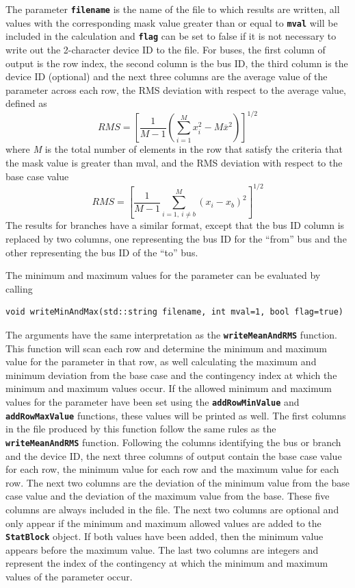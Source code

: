 The parameter \texttt{\textbf{filename}} is the name of the file to which results are written, all values with the corresponding mask value greater than or equal to \texttt{\textbf{mval}} will be included in the calculation and \texttt{\textbf{flag}} can be set to false if it is not necessary to write out the 2-character device ID to the file. For buses, the first column of output is the row index, the second column is the bus ID, the third column is the device ID (optional) and the next three columns are the average value of the parameter across each row, the RMS deviation with respect to the average value, defined as\[RMS={\left[\frac{1}{M-1}\left(\sum^M_{i=1}{x^2_i-M{\overline{x}}^2}\right)\right]}^{1/2}\] 
where \textit{M} is the total number of elements in the row that satisfy the criteria that the mask value is greater than mval, and the RMS deviation with respect to the base case value
\[RMS={\left[\frac{1}{M-1}\sum^M_{i=1,\ i\neq b}{{\left(x_i-x_b\right)}^2}\right]}^{1/2}\] 
The results for branches have a similar format, except that the bus ID column is replaced by two columns, one representing the bus ID for the ``from'' bus and the other representing the bus ID of the ``to'' bus.

The minimum and maximum values for the parameter can be evaluated by calling

{
\color{red}
\begin{Verbatim}[fontseries=b]
void writeMinAndMax(std::string filename, int mval=1, bool flag=true)
\end{Verbatim}
}

The arguments have the same interpretation as the \texttt{\textbf{writeMeanAndRMS}} function. This function will scan each row and determine the minimum and maximum value for the parameter in that row, as well calculating the maximum and minimum deviation from the base case and the contingency index at which the minimum and maximum values occur. If the allowed minimum and maximum values for the parameter have been set using the \texttt{\textbf{addRowMinValue}} and \texttt{\textbf{addRowMaxValue}} functions, these values will be printed as well. The first columns in the file produced by this function follow the same rules as the \texttt{\textbf{writeMeanAndRMS}} function. Following the columns identifying the bus or branch and the device ID, the next three columns of output contain the base case value for each row, the minimum value for each row and the maximum value for each row.  The next two columns are the deviation of the minimum value from the base case value and the deviation of the maximum value from the base. These five columns are always included in the file. The next two columns are optional and only appear if the minimum and maximum allowed values are added to the \texttt{\textbf{StatBlock}} object. If both values have been added, then the minimum value appears before the maximum value. The last two columns are integers and represent the index of the contingency at which the minimum and maximum values of the parameter occur.

